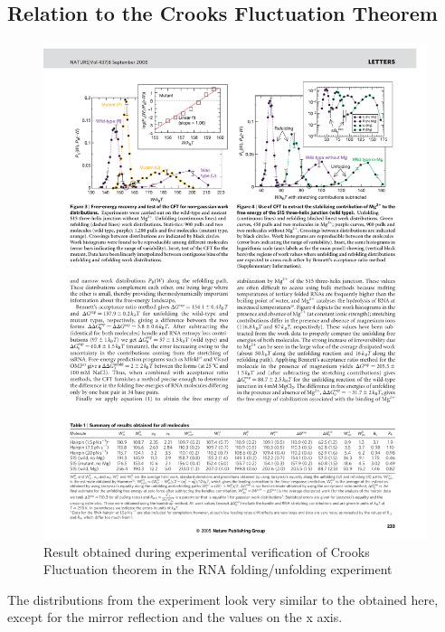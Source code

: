 \documentclass[a0]{sciposter}
\begin{document}
\begin{multicols}{3}
\section{Relation to the Crooks Fluctuation Theorem}
\vspace{-1.0cm} 
\begin{minipage}[b]{22.0cm}
\centering
\begin{figure}[ht!]
 \includegraphics[clip, trim=1.0cm 19.3cm 11.0cm 2.1cm, width=20cm]{verification.pdf}
 \caption{Result obtained during experimental verification of Crooks Fluctuation theorem in the RNA folding/unfolding experiment \cite{Collin:2005fxa}}
\end{figure}
\end{minipage}
\begin{flushleft}
\vspace{-1.0cm} 
The distributions from the experiment look very similar to the obtained here, except for the mirror reflection and the values on the x axis.


\end{flushleft}
\end{multicols}
\end{document}
